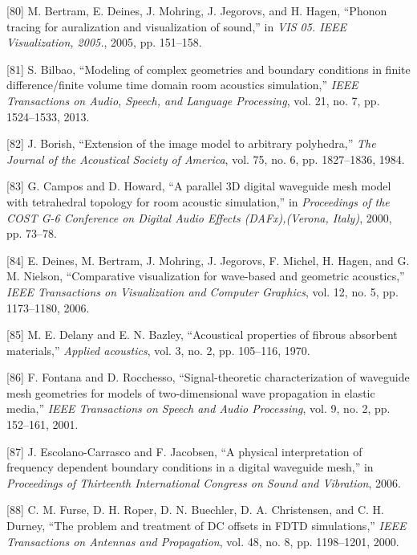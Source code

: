 \documentclass[]{scrreprt}
\begin{document}
\hypertarget{ref-bertramux5fphononux5f2005}{}
{[}80{]} M. Bertram, E. Deines, J. Mohring, J. Jegorovs, and H. Hagen,
``Phonon tracing for auralization and visualization of sound,'' in
\emph{VIS 05. IEEE Visualization, 2005.}, 2005, pp. 151--158.

\hypertarget{ref-bilbaoux5fmodelingux5f2013}{}
{[}81{]} S. Bilbao, ``Modeling of complex geometries and boundary
conditions in finite difference/finite volume time domain room acoustics
simulation,'' \emph{IEEE Transactions on Audio, Speech, and Language
Processing}, vol. 21, no. 7, pp. 1524--1533, 2013.

\hypertarget{ref-borishux5fextensionux5f1984}{}
{[}82{]} J. Borish, ``Extension of the image model to arbitrary
polyhedra,'' \emph{The Journal of the Acoustical Society of America},
vol. 75, no. 6, pp. 1827--1836, 1984.

\hypertarget{ref-camposux5fparallelux5f2000}{}
{[}83{]} G. Campos and D. Howard, ``A parallel 3D digital waveguide mesh
model with tetrahedral topology for room acoustic simulation,'' in
\emph{Proceedings of the COST G-6 Conference on Digital Audio Effects
(DAFx),(Verona, Italy)}, 2000, pp. 73--78.

\hypertarget{ref-deinesux5fcomparativeux5f2006}{}
{[}84{]} E. Deines, M. Bertram, J. Mohring, J. Jegorovs, F. Michel, H.
Hagen, and G. M. Nielson, ``Comparative visualization for wave-based and
geometric acoustics,'' \emph{IEEE Transactions on Visualization and
Computer Graphics}, vol. 12, no. 5, pp. 1173--1180, 2006.

\hypertarget{ref-delanyux5facousticalux5f1970}{}
{[}85{]} M. E. Delany and E. N. Bazley, ``Acoustical properties of
fibrous absorbent materials,'' \emph{Applied acoustics}, vol. 3, no. 2,
pp. 105--116, 1970.

\hypertarget{ref-fontanaux5fsignal-theoreticux5f2001}{}
{[}86{]} F. Fontana and D. Rocchesso, ``Signal-theoretic
characterization of waveguide mesh geometries for models of
two-dimensional wave propagation in elastic media,'' \emph{IEEE
Transactions on Speech and Audio Processing}, vol. 9, no. 2, pp.
152--161, 2001.

\hypertarget{ref-escolano-carrascoux5fphysicalux5f2006}{}
{[}87{]} J. Escolano-Carrasco and F. Jacobsen, ``A physical
interpretation of frequency dependent boundary conditions in a digital
waveguide mesh,'' in \emph{Proceedings of Thirteenth International
Congress on Sound and Vibration}, 2006.

\hypertarget{ref-furseux5fproblemux5f2000}{}
{[}88{]} C. M. Furse, D. H. Roper, D. N. Buechler, D. A. Christensen,
and C. H. Durney, ``The problem and treatment of DC offsets in FDTD
simulations,'' \emph{IEEE Transactions on Antennas and Propagation},
vol. 48, no. 8, pp. 1198--1201, 2000.
\end{document}
